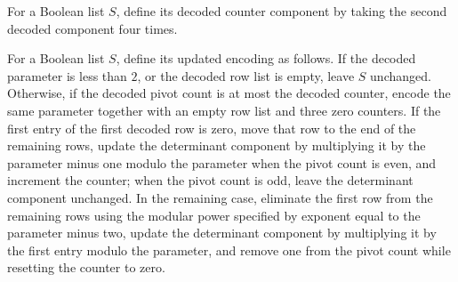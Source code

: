 \begin{definition}
\label{Complexity.BinArith.slC}
\leanok
{}
For a Boolean list $S$, define its decoded counter component by taking the second
decoded component four times.
\end{definition}

\begin{definition}
\label{Complexity.BinArith.detWStep}
\leanok
{}
For a Boolean list $S$, define its updated encoding as follows. If the decoded parameter
is less than $2$, or the decoded row list is empty, leave $S$ unchanged. Otherwise, if
the decoded pivot count is at most the decoded counter, encode the same parameter
together with an empty row list and three zero counters. If the first entry of the first
decoded row is zero, move that row to the end of the remaining rows, update the
determinant component by multiplying it by the parameter minus one modulo the parameter
when the pivot count is even, and increment the counter; when the pivot count is odd,
leave the determinant component unchanged. In the remaining case, eliminate the first
row from the remaining rows using the modular power specified by exponent equal to the
parameter minus two, update the determinant component by multiplying it by the first
entry modulo the parameter, and remove one from the pivot count while resetting the
counter to zero.
\end{definition}

